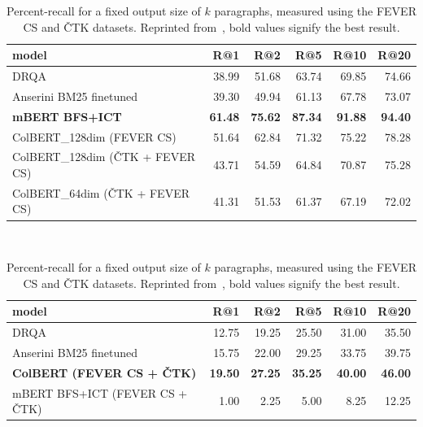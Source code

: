 \begin{table}[H] {}
\begin{ctucolortab}\begin{tabularx}{.95\textwidth}{lrrrrr}
    \toprule
                               model &    R@1 &    R@2 &    R@5 &   R@10 &   R@20  \\
    \midrule
                                \textsf{DRQA} &  38.99 &  51.68 &  63.74 &  69.85 &  74.66  \\
             \textsf{Anserini BM25 finetuned} &  39.30 &  49.94 &  61.13 &  67.78 &  73.07 \\
                       \textbf{\textsf{mBERT BFS+ICT}} &  \textbf{61.48} &  \textbf{75.62} &  \textbf{87.34} &  \textbf{91.88} &  \textbf{94.40}  \\
           \textsf{ColBERT\_128dim (FEVER CS)} &  51.64 &  62.84 &  71.32 &  75.22 &  78.28  \\
     \textsf{ColBERT\_128dim (ČTK + FEVER CS)} &  43.71 &  54.59 &  64.84 &  70.87 &  75.28  \\
      \textsf{ColBERT\_64dim (ČTK + FEVER CS)} &  41.31 &  51.53 &  61.37 &  67.19 &  72.02  \\
    \bottomrule
    \end{tabularx}
\end{ctucolortab}

~


    
\begin{ctucolortab}\begin{tabularx}{.95\textwidth}{lrrrrr}
    \toprule
                              model &    R@1 &    R@2 &    R@5 &   R@10 &   R@20  \\
    \midrule
                               \textsf{DRQA} &  12.75 &  19.25 &  25.50 &  31.00 &  35.50  \\
            \textsf{Anserini BM25 finetuned} &  15.75 &  22.00 &  29.25 &  33.75 &  39.75  \\
          \textbf{\textsf{ColBERT (FEVER CS + ČTK)}} &  \textbf{19.50} &  \textbf{27.25} &  \textbf{35.25} &  \textbf{40.00} &  \textbf{46.00} \\
     \textsf{mBERT BFS+ICT (FEVER CS + ČTK)} &   1.00 &   2.25 &   5.00 &   8.25 &  12.25 \\
    \bottomrule
    \end{tabularx}
\end{ctucolortab}

    \caption[Recall for a fixed output size of $k$ paragraphs, measured using the \textsf{FEVER CS} and \textsf{ČTK} datasets]{Percent-recall for a fixed output size of $k$ paragraphs, measured using the \textsf{FEVER CS} and \textsf{ČTK} datasets. Reprinted from~\cite{rypar}, bold values signify the best result.}
    \label{tab:dr}
\end{table} %


